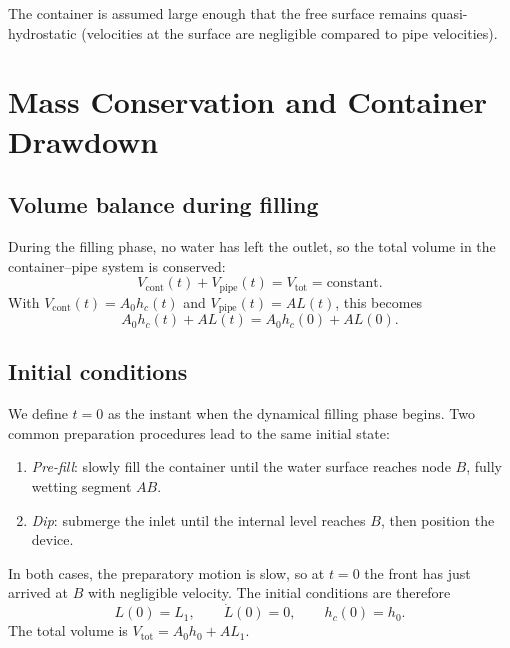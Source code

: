 \documentclass[11pt]{article}
\theoremstyle{definition}
\begin{document}
The container is assumed large enough that the free surface remains quasi-hydrostatic 
(velocities at the surface are negligible compared to pipe velocities).

\section{Mass Conservation and Container Drawdown}
\label{sec:conservation}

\subsection{Volume balance during filling}

During the filling phase, no water has left the outlet, so the total volume in the 
container--pipe system is conserved:
\begin{equation}
  V_{\text{cont}}(t) + V_{\text{pipe}}(t) = V_{\text{tot}} = \text{constant}.
  \label{eq:vol-conserve}
\end{equation}
With $V_{\text{cont}}(t) = A_0 h_c(t)$ and $V_{\text{pipe}}(t) = A L(t)$, this becomes
\[
  A_0 h_c(t) + A L(t) = A_0 h_c(0) + A L(0).
\]

\subsection{Initial conditions}
\label{sec:ICs}

We define $t = 0$ as the instant when the dynamical filling phase begins. Two common 
preparation procedures lead to the same initial state:
\begin{enumerate}[nosep]
  \item \emph{Pre-fill}: slowly fill the container until the water surface reaches node $B$, 
        fully wetting segment $AB$.
  \item \emph{Dip}: submerge the inlet until the internal level reaches $B$, then position 
        the device.
\end{enumerate}
In both cases, the preparatory motion is slow, so at $t = 0$ the front has just arrived at 
$B$ with negligible velocity. The initial conditions are therefore
\begin{equation}
  \boxed{L(0) = L_1, \qquad \dot{L}(0) = 0, \qquad h_c(0) = h_0.}
  \label{eq:ICs}
\end{equation}
The total volume is $V_{\text{tot}} = A_0 h_0 + A L_1$.
\end{document}

